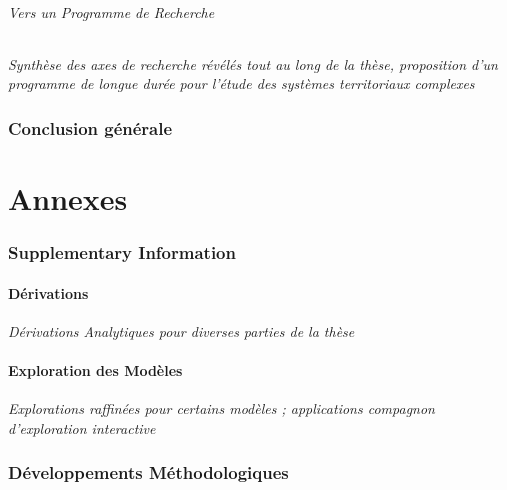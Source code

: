 
\paragraph{Vers un Programme de Recherche}

\textit{Synthèse des axes de recherche révélés tout au long de la thèse, proposition d'un programme de longue durée pour l'étude des systèmes territoriaux complexes}



\section*{Conclusion générale}



\part*{Annexes}








\section{Supplementary Information}


\subsection{Dérivations}

\textit{Dérivations Analytiques pour diverses parties de la thèse}


\subsection{Exploration des Modèles}

\textit{Explorations raffinées pour certains modèles ; applications compagnon d'exploration interactive}


\section{Développements Méthodologiques}

